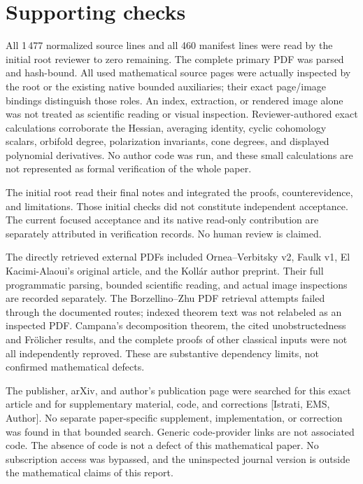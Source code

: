 \documentclass[10pt]{article}
\begin{document}
\section*{Supporting checks}
All 1 477 normalized source lines and all 460 manifest lines were read by the initial root reviewer to zero remaining. The complete primary PDF was parsed and hash-bound. All used mathematical source pages were actually inspected by the root or the existing native bounded auxiliaries; their exact page/image bindings distinguish those roles. An index, extraction, or rendered image alone was not treated as scientific reading or visual inspection. Reviewer-authored exact calculations corroborate the Hessian, averaging identity, cyclic cohomology scalars, orbifold degree, polarization invariants, cone degrees, and displayed polynomial derivatives. No author code was run, and these small calculations are not represented as formal verification of the whole paper.\par
The initial root read their final notes and integrated the proofs, counterevidence, and limitations. Those initial checks did not constitute independent acceptance. The current focused acceptance and its native read-only contribution are separately attributed in verification records. No human review is claimed.\par
The directly retrieved external PDFs included Ornea–Verbitsky v2, Faulk v1, El Kacimi-Alaoui’s original article, and the Kollár author preprint. Their full programmatic parsing, bounded scientific reading, and actual image inspections are recorded separately. The Borzellino–Zhu PDF retrieval attempts failed through the documented routes; indexed theorem text was not relabeled as an inspected PDF. Campana’s decomposition theorem, the cited unobstructedness and Frölicher results, and the complete proofs of other classical inputs were not all independently reproved. These are substantive dependency limits, not confirmed mathematical defects.\par
The publisher, arXiv, and author’s publication page were searched for this exact article and for supplementary material, code, and corrections [Istrati, EMS, Author]. No separate paper-specific supplement, implementation, or correction was found in that bounded search. Generic code-provider links are not associated code. The absence of code is not a defect of this mathematical paper. No subscription access was bypassed, and the uninspected journal version is outside the mathematical claims of this report.\par
\end{document}

